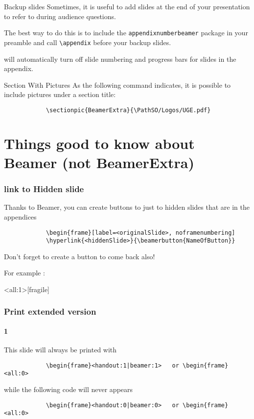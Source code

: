 	
	\begin{frame}[fragile]{Backup slides}
		Sometimes, it is useful to add slides at the end of your presentation to
		refer to during audience questions.
		
		The best way to do this is to include the \verb|appendixnumberbeamer|
		package in your preamble and call \verb|\appendix| before your backup slides.
		
		\themename will automatically turn off slide numbering and progress bars for
		slides in the appendix.
	\end{frame}
	
	\begin{frame}[fragile, label=previouSlide]{Section With Pictures}
		As the following command indicates, it is possible to include pictures under a section title:
		\begin{verbatim}			
			\sectionpic{BeamerExtra}{\PathSO/Logos/UGE.pdf}		
		\end{verbatim}
	\end{frame}
	
\section{Things good to know about Beamer (not BeamerExtra)}
	
	\begin{frame}[fragile]
		\frametitle{link to Hidden slide}
		
		Thanks to Beamer, you can create buttons to just to hidden slides that are in the appendices
		\begin{verbatim}			
			\begin{frame}[label=<originalSlide>, noframenumbering]	
			\hyperlink{<hiddenSlide>}{\beamerbutton{NameOfButton}}
		\end{verbatim}
		
		Don't forget to create a button to come back also!
		
		For example :
		\hyperlink{previouSlide}{}
	\end{frame}
	
	\begin{frame}<all:1>[fragile]
		\frametitle{Print extended version}
		\framesubtitle{1}
		
		This slide will always be printed with 
		\begin{verbatim}			
			\begin{frame}<handout:1|beamer:1>	or \begin{frame}<all:0>
		\end{verbatim}
		
		while the following code will never appears
		\begin{verbatim}			
			\begin{frame}<handout:0|beamer:0>	or \begin{frame}<all:0>	
		\end{verbatim}
	\end{frame}
	
